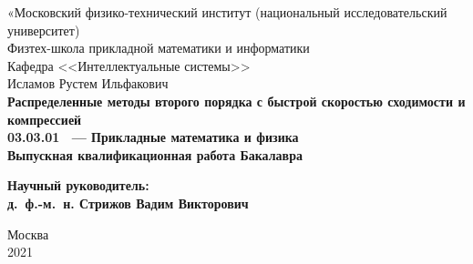 \documentclass[12pt]{article}
\begin{document}
\thispagestyle{empty}
\begin{center}
    \sc
            «Московский физико-технический институт 
        {\rm (национальный
исследовательский университет)}\\
        Физтех-школа прикладной математики и информатики\\
        Кафедра <<Интеллектуальные системы>>\\[35mm]
    \rm\large
        Исламов Рустем Ильфакович\\[10mm]
    \bf\Large
		Распределенные методы второго порядка с быстрой скоростью сходимости и компрессией\\[10mm]
    \rm\normalsize
        03.03.01 ~--- Прикладные математика и физика\\[10mm]
    \sc
        Выпускная квалификационная работа Бакалавра\\[10mm]
\end{center}
\hfill\parbox{80mm}{
    \begin{flushleft}
    \bf
        Научный руководитель:\\
    \rm
        д.~ф.-м.~н. Стрижов Вадим Викторович\\[5cm]
    \end{flushleft}
}
\begin{center}
    Москва\\
    2021
\end{center}
\end{document}
